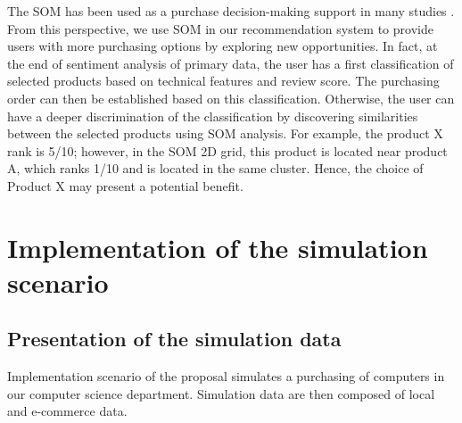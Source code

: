\documentclass[preprint,3p,onecolumn]{elsarticle}
\begin{document}
The SOM has been used as a purchase decision-making support in many studies \citep {kohara2006purchase} \citep {martins2017intelligent} \citep {kohara2013selecting} \citep {cho2014clustering}. From this perspective, we use SOM in our recommendation system to provide users with more purchasing options by exploring new opportunities. In fact, at the end of sentiment analysis of primary data, the user has a first classification of selected products based on technical features and review score. The purchasing order can then be established based on this classification. Otherwise, the user can have a deeper discrimination of the classification by discovering similarities between the selected products using SOM analysis. For example, the product X rank is 5/10; however, in the SOM 2D grid, this product is located near product A, which ranks 1/10 and is located in the same cluster. Hence, the choice of Product X may present a potential benefit.


\section{Implementation of the simulation scenario}
\subsection{Presentation of the simulation data}
\par Implementation scenario of the proposal simulates a purchasing of computers in our computer science department. Simulation data are then composed of   local and e-commerce data.
\end{document}
